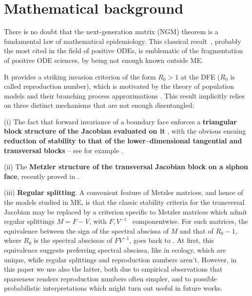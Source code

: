 \section{Mathematical background}




There is no doubt that the
next-generation matrix (NGM) theorem is a fundamental law of mathematical epidemiology.
This classical result~\cNGM, probably the most cited  in the field of positive
ODEs,   is emblematic of the fragmentation of positive ODE sciences, by being not enough known   outside  ME.

It provides a  striking invasion criterion of the form $R_0 >1$ at the DFE ($R_0$ is called  reproduction number), which is motivated by the theory of population models
\cite{Lotka} and their branching process  approximations \cite{kendall1966branching}. This result implicitly relies on
three distinct mechanisms that are not enough disentangled:

(i) The fact that forward invariance of a boundary face  enforces a {\bf triangular block structure of
the Jacobian  evaluated on it} \cite{AAH26},
with  the obvious ensuing {\bf reduction of  stability to that of the  lower--dimensional tangential and transversal blocks} -- see for example \cite{JA}.


(ii) The {\bf Metzler structure of the transversal Jacobian
block on a siphon face}, recently proved in \cite{AAHK}.

(iii)  {\bf Regular splitting}. A convenient  feature of Metzler matrices, and hence of the models studied in ME, is that the classic stability criteria for the transversal Jacobian may be replaced by a criterion specific to  Metzler matrices which admit regular splittings $M=F-V$, with $F, V^{-1}$ \nne\ componentwise.
For such matrices, the equivalence between the sign of the spectral abscissa of $M$ and that of $R_0-1$, where $R_0$ is the spectral abscissas of $F V^{-1}$, goes
back to
\cite{Varga,Berman,Van}. At first,
this equivalence suggests preferring spectral abscissa, like in ecology, which are unique,
while regular splittings and reproduction numbers aren't. However, in this paper we  use also the latter, both due to empirical observations that sparseness renders reproduction numbers  often simpler, and to possible probabilistic interpretations which might turn out useful in future works.

